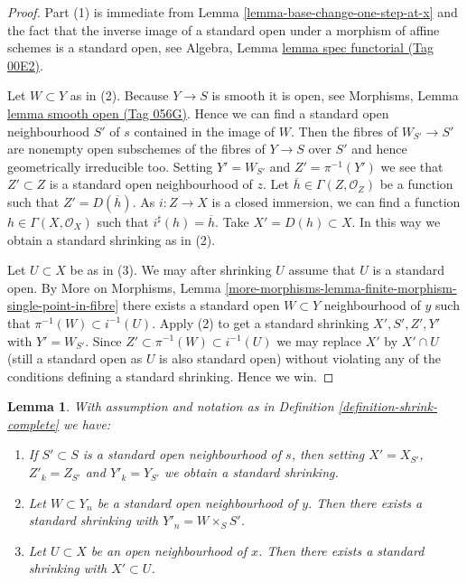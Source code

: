 \documentclass{amsart}
\theoremstyle{plain}
\newtheorem{lemma}[subsection]{Lemma}
\theoremstyle{definition}
\theoremstyle{remark}
\numberwithin{equation}{subsection}
\begin{document}
\begin{proof}
Part (1) is immediate from
Lemma \ref{lemma-base-change-one-step-at-x}
and the fact that the inverse image of a standard open under a morphism
of affine schemes is a standard open, see
Algebra, Lemma \href{https://stacks.math.columbia.edu/tag/00E2}{lemma spec functorial (Tag 00E2)}.

\medskip\noindent
Let $W \subset Y$ as in (2). Because $Y \to S$ is smooth it is open, see
Morphisms, Lemma \href{https://stacks.math.columbia.edu/tag/056G}{lemma smooth open (Tag 056G)}.
Hence we can find a standard open neighbourhood $S'$ of $s$
contained in the image of $W$. Then the fibres of $W_{S'} \to S'$
are nonempty open subschemes of the fibres of $Y \to S$ over $S'$
and hence geometrically irreducible too. Setting $Y' = W_{S'}$
and $Z' = \pi^{-1}(Y')$ we see that $Z' \subset Z$ is a standard open
neighbourhood of $z$. Let $\overline{h} \in \Gamma(Z, \mathcal{O}_Z)$
be a function such that $Z' = D(\overline{h})$. As $i : Z \to X$
is a closed immersion, we can find a function $h \in \Gamma(X, \mathcal{O}_X)$
such that $i^\sharp(h) = \overline{h}$. Take $X' = D(h) \subset X$.
In this way we obtain a standard shrinking as in (2).

\medskip\noindent
Let $U \subset X$ be as in (3). We may after shrinking $U$ assume that
$U$ is a standard open. By
More on Morphisms,
Lemma \ref{more-morphisms-lemma-finite-morphism-single-point-in-fibre}
there exists a standard open $W \subset Y$ neighbourhood of $y$ such
that $\pi^{-1}(W) \subset i^{-1}(U)$. Apply (2) to get a standard
shrinking $X', S', Z', Y'$ with $Y' = W_{S'}$. Since
$Z' \subset \pi^{-1}(W) \subset i^{-1}(U)$ we may replace $X'$ by
$X' \cap U$ (still a standard open as $U$ is also standard open)
without violating any of the conditions defining a standard shrinking.
Hence we win.
\end{proof}


\begin{lemma}
\label{lemma-shrink-complete}
With assumption and notation as in
Definition \ref{definition-shrink-complete}
we have:
\begin{enumerate}
\item
\label{item-shrink-base-complete}
If $S' \subset S$ is a standard open neighbourhood of $s$, then
setting $X' = X_{S'}$, $Z'_k = Z_{S'}$ and $Y'_k = Y_{S'}$ we obtain a
standard shrinking.
\item
\label{item-shrink-on-Y-complete}
Let $W \subset Y_n$ be a standard open neighbourhood of $y$.
Then there exists a standard shrinking with $Y'_n = W \times_S S'$.
\item
\label{item-shrink-on-X-complete}
Let $U \subset X$ be an open neighbourhood of $x$.
Then there exists a standard shrinking with $X' \subset U$.
\end{enumerate}
\end{lemma}
\end{document}
